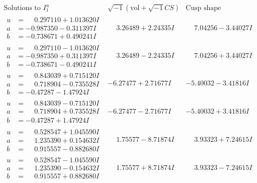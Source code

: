 \documentclass[1p]{elsarticle_modified}
\theoremstyle{definition}
\newcommand{\I}{\sqrt{-1}}
\begin{document}
$$\begin{array}{c|c|c}  
\text{Solutions to }I^u_{1}& \I (\text{vol} + \sqrt{-1}CS) & \text{Cusp shape}\\
 \hline 
\begin{aligned}
u &= \phantom{-}0.297110 + 1.013620 I \\
a &= -0.987350 - 0.311397 I \\
b &= -0.738671 + 0.490241 I\end{aligned}
 & \phantom{-}3.26489 + 2.24335 I & \phantom{-}7.04256 - 3.44027 I \\ \hline\begin{aligned}
u &= \phantom{-}0.297110 - 1.013620 I \\
a &= -0.987350 + 0.311397 I \\
b &= -0.738671 - 0.490241 I\end{aligned}
 & \phantom{-}3.26489 - 2.24335 I & \phantom{-}7.04256 + 3.44027 I \\ \hline\begin{aligned}
u &= \phantom{-}0.843039 + 0.715120 I \\
a &= \phantom{-}0.718904 - 0.735528 I \\
b &= -0.47287 - 1.47924 I\end{aligned}
 & -6.27477 + 2.71677 I & -5.40032 - 3.41816 I \\ \hline\begin{aligned}
u &= \phantom{-}0.843039 - 0.715120 I \\
a &= \phantom{-}0.718904 + 0.735528 I \\
b &= -0.47287 + 1.47924 I\end{aligned}
 & -6.27477 - 2.71677 I & -5.40032 + 3.41816 I \\ \hline\begin{aligned}
u &= \phantom{-}0.528547 + 1.045590 I \\
a &= \phantom{-}1.235390 + 0.154632 I \\
b &= \phantom{-}0.915557 - 0.882680 I\end{aligned}
 & \phantom{-}1.75577 - 8.71874 I & \phantom{-}3.93323 + 7.24615 I \\ \hline\begin{aligned}
u &= \phantom{-}0.528547 - 1.045590 I \\
a &= \phantom{-}1.235390 - 0.154632 I \\
b &= \phantom{-}0.915557 + 0.882680 I\end{aligned}
 & \phantom{-}1.75577 + 8.71874 I & \phantom{-}3.93323 - 7.24615 I \\ \hline\begin{aligned}

\end{aligned}
\end{array}$$
\end{document}
